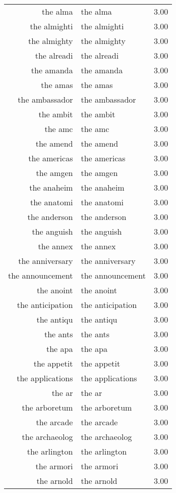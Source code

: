 \begin{table}[ht]
\begin{tabular}{rlr}
  the alma & the alma & 3.00 \\ 
  the almighti & the almighti & 3.00 \\ 
  the almighty & the almighty & 3.00 \\ 
  the alreadi & the alreadi & 3.00 \\ 
  the amanda & the amanda & 3.00 \\ 
  the amas & the amas & 3.00 \\ 
  the ambassador & the ambassador & 3.00 \\ 
  the ambit & the ambit & 3.00 \\ 
  the amc & the amc & 3.00 \\ 
  the amend & the amend & 3.00 \\ 
  the americas & the americas & 3.00 \\ 
  the amgen & the amgen & 3.00 \\ 
  the anaheim & the anaheim & 3.00 \\ 
  the anatomi & the anatomi & 3.00 \\ 
  the anderson & the anderson & 3.00 \\ 
  the anguish & the anguish & 3.00 \\ 
  the annex & the annex & 3.00 \\ 
  the anniversary & the anniversary & 3.00 \\ 
  the announcement & the announcement & 3.00 \\ 
  the anoint & the anoint & 3.00 \\ 
  the anticipation & the anticipation & 3.00 \\ 
  the antiqu & the antiqu & 3.00 \\ 
  the ants & the ants & 3.00 \\ 
  the apa & the apa & 3.00 \\ 
  the appetit & the appetit & 3.00 \\ 
  the applications & the applications & 3.00 \\ 
  the ar & the ar & 3.00 \\ 
  the arboretum & the arboretum & 3.00 \\ 
  the arcade & the arcade & 3.00 \\ 
  the archaeolog & the archaeolog & 3.00 \\ 
  the arlington & the arlington & 3.00 \\ 
  the armori & the armori & 3.00 \\ 
  the arnold & the arnold & 3.00 \\ 

\end{tabular}
\end{table}

